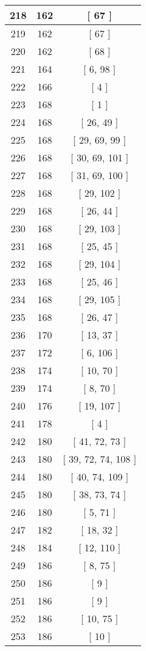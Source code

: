 \begin{center}
\begin{longtable}[H]{|| c c c ||}
\hline
218 & 162 & [ 67 ] \\ 
\hline
219 & 162 & [ 67 ] \\ 
\hline
220 & 162 & [ 68 ] \\ 
\hline
221 & 164 & [ 6, 98 ] \\ 
\hline
222 & 166 & [ 4 ] \\ 
\hline
223 & 168 & [ 1 ] \\ 
\hline
224 & 168 & [ 26, 49 ] \\ 
\hline
225 & 168 & [ 29, 69, 99 ] \\ 
\hline
226 & 168 & [ 30, 69, 101 ] \\ 
\hline
227 & 168 & [ 31, 69, 100 ] \\ 
\hline
228 & 168 & [ 29, 102 ] \\ 
\hline
229 & 168 & [ 26, 44 ] \\ 
\hline
230 & 168 & [ 29, 103 ] \\ 
\hline
231 & 168 & [ 25, 45 ] \\ 
\hline
232 & 168 & [ 29, 104 ] \\ 
\hline
233 & 168 & [ 25, 46 ] \\ 
\hline
234 & 168 & [ 29, 105 ] \\ 
\hline
235 & 168 & [ 26, 47 ] \\ 
\hline
236 & 170 & [ 13, 37 ] \\ 
\hline
237 & 172 & [ 6, 106 ] \\ 
\hline
238 & 174 & [ 10, 70 ] \\ 
\hline
239 & 174 & [ 8, 70 ] \\ 
\hline
240 & 176 & [ 19, 107 ] \\ 
\hline
241 & 178 & [ 4 ] \\ 
\hline
242 & 180 & [ 41, 72, 73 ] \\ 
\hline
243 & 180 & [ 39, 72, 74, 108 ] \\ 
\hline
244 & 180 & [ 40, 74, 109 ] \\ 
\hline
245 & 180 & [ 38, 73, 74 ] \\ 
\hline
246 & 180 & [ 5, 71 ] \\ 
\hline
247 & 182 & [ 18, 32 ] \\ 
\hline
248 & 184 & [ 12, 110 ] \\ 
\hline
249 & 186 & [ 8, 75 ] \\ 
\hline
250 & 186 & [ 9 ] \\ 
\hline
251 & 186 & [ 9 ] \\ 
\hline
252 & 186 & [ 10, 75 ] \\ 
\hline
253 & 186 & [ 10 ] \\ 

\end{longtable}
\end{center}
